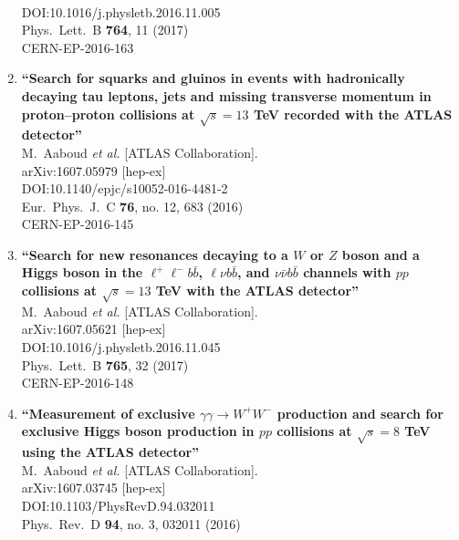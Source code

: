 \documentclass{article}
\begin{document}
\begin{enumerate}
  \\{}DOI:10.1016/j.physletb.2016.11.005
  \\{}Phys.\ Lett.\ B {\bf 764}, 11 (2017)
  \\{}CERN-EP-2016-163
\item%
{\bf ``Search for squarks and gluinos in events with hadronically decaying tau leptons, jets and missing transverse momentum in proton–proton collisions at $\sqrt{s}=13$  TeV recorded with the ATLAS detector''}
  \\{}M.~Aaboud {\it et al.} [ATLAS Collaboration].
  \\{}arXiv:1607.05979 [hep-ex]
  \\{}DOI:10.1140/epjc/s10052-016-4481-2
  \\{}Eur.\ Phys.\ J.\ C {\bf 76}, no. 12, 683 (2016)
  \\{}CERN-EP-2016-145
\item%
{\bf ``Search for new resonances decaying to a $W$ or $Z$ boson and a Higgs boson in the $\ell^+ \ell^- b\bar b$, $\ell \nu b\bar b$, and $\nu\bar{\nu} b\bar b$ channels with $pp$ collisions at $\sqrt s = 13$ TeV with the ATLAS detector''}
  \\{}M.~Aaboud {\it et al.} [ATLAS Collaboration].
  \\{}arXiv:1607.05621 [hep-ex]
  \\{}DOI:10.1016/j.physletb.2016.11.045
  \\{}Phys.\ Lett.\ B {\bf 765}, 32 (2017)
  \\{}CERN-EP-2016-148
\item%
{\bf ``Measurement of exclusive $\gamma\gamma\rightarrow W^+W^-$ production and search for exclusive Higgs boson production in $pp$ collisions at $\sqrt{s} = 8$ TeV using the ATLAS detector''}
  \\{}M.~Aaboud {\it et al.} [ATLAS Collaboration].
  \\{}arXiv:1607.03745 [hep-ex]
  \\{}DOI:10.1103/PhysRevD.94.032011
  \\{}Phys.\ Rev.\ D {\bf 94}, no. 3, 032011 (2016)

\end{enumerate}
\end{document}
